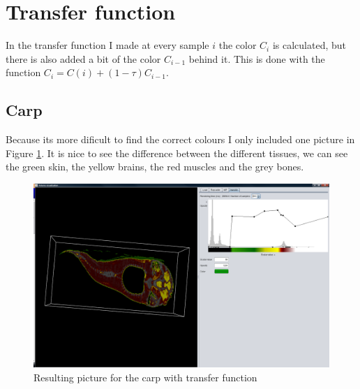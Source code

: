 \documentclass[a4paper,twoside,11pt]{article}
\begin{document}
\section{Transfer function}
In the transfer function I made at every sample $i$ the color $C_i$ is calculated, but there is also added a bit of the color $C_{i-1}$ behind it. This is done with the function $C_i = C(i)+ (1-\tau)C_{i-1}$.
 \subsection{Carp}
 Because its more dificult to find the correct colours I only included one picture in Figure \ref{hi}. It is nice to see the difference between the different tissues, we can see the green skin, the yellow brains, the red muscles and the grey bones.

\begin{figure}[!h]
  \centering
  \includegraphics[width=1\textheight, angle=90]{hicarp.png}
  \caption{Resulting picture for the carp with transfer function}
  \label{hi}
\end{figure}
\end{document}

